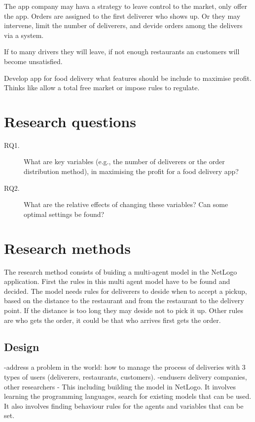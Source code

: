 The app company may hava a strategy to leave control to the market, only offer the app.
Orders are assigned to the first deliverer who shows up.
Or they may intervene, limit the number of deliverers, and devide orders among the delivers via a system.







If to many drivers they will leave, if not enough restaurants an customers will become unsatisfied.



Develop app for food delivery what features should be include to maximise profit.
Thinks like allow a total free market or impose rules to regulate.



\section{Research questions}

\begin{description}
    \item[RQ1.] What are key variables (e.g., the number of deliverers or the order distribution method), in maximising the profit for a food delivery app?
    \item[RQ2.] What are the relative effects of changing these variables? Can some optimal settings be found?
\end{description}

\section{Research methods}
The research method consists of buiding a multi-agent model in the NetLogo application.
First the rules in this multi agent model have to be found and decided.
The model needs rules for deliverers to deside when to accept a pickup, based on the distance to the restaurant and from the restaurant to the delivery point.
If the distance is too long they may deside not to pick it up.
Other rules are who gets the order, it could be that who arrives first gets the order.

\subsection{Design}
-address a problem in the world: how to manage the process of deliveries with 3 types of users (deliverers, restaurants, customers).
-endusers delivery companies, other researchers
-
This including building the model in NetLogo.
It involves learning the programming languages, search for existing models that can be used.
It also involves finding behaviour rules for the agents and variables that can be set.

